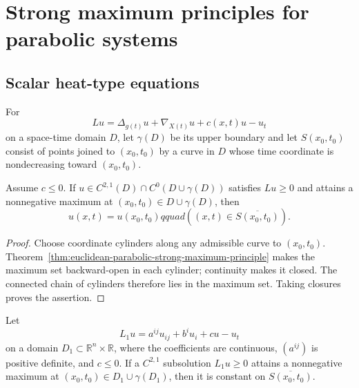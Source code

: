 \section{Strong maximum principles for parabolic systems}

\subsection{Scalar heat-type equations}

For
\[
Lu=\Delta_{g(t)}u+\nabla_{X(t)}u+c(x,t)u-u_t
\]
on a space-time domain $D$, let $\gamma(D)$ be its upper boundary and let
$S(x_0,t_0)$ consist of points joined to $(x_0,t_0)$ by a curve in $D$ whose
time coordinate is nondecreasing toward $(x_0,t_0)$.

\begin{theorem}
\label{thm:manifold-parabolic-strong-maximum-principle}
Assume $c\leq0$.  If $u\in C^{2,1}(D)\cap C^0(D\cup\gamma(D))$ satisfies
$Lu\geq0$ and attains a nonnegative maximum at
$(x_0,t_0)\in D\cup\gamma(D)$, then
\[
u(x,t)=u(x_0,t_0)qquad ((x,t)\in\overline{S(x_0,t_0)}).
\]
\end{theorem}

\begin{proof}
Choose coordinate cylinders along any admissible curve to $(x_0,t_0)$.
Theorem~\ref{thm:euclidean-parabolic-strong-maximum-principle} makes the
maximum set backward-open in each cylinder; continuity makes it closed.
The connected chain of cylinders therefore lies in the maximum set.  Taking
closures proves the assertion.
\end{proof}

\begin{theorem}
\label{thm:euclidean-parabolic-strong-maximum-principle}
Let
\[
L_1u=a^{ij}u_{ij}+b^iu_i+cu-u_t
\]
on a domain $D_1\subset\mathbb R^n\times\mathbb R$, where the coefficients
are continuous, $(a^{ij})$ is positive definite, and $c\leq0$.  If a
$C^{2,1}$ subsolution $L_1u\geq0$ attains a nonnegative maximum at
$(x_0,t_0)\in D_1\cup\gamma(D_1)$, then it is constant on
$\overline{S(x_0,t_0)}$.
\end{theorem}

